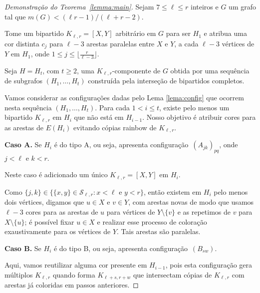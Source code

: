 \documentclass[12pt,a4paper]{book}
\newcommand{\K}{K_{\ell,r}} %
\newcommand{\Slr}{\mathcal{S}_{\ell,r}} %
\begin{document}
    \begin{proof}[Demonstração do Teorema~\ref{lemma:main}]
      Sejam $7 \leq \ell \leq r$ inteiros e $G$ um grafo tal que $m(G) < (\ell r - 1)/(\ell+r-2)$.
    
        Tome um bipartido $\K = [X,Y]$ arbitrário em $G$ para ser $H_1$ e atribua uma cor distinta $c_j$ para $\ell-3$ arestas paralelas entre $X$ e $Y$, a cada $\ell-3$ vértices de $Y$ em $H_1$, onde
        $1 \leq j \leq \lfloor \frac{r}{\ell-3}\rfloor$.

        Seja $H = H_t$, com $t \geq 2$, uma $\K$-componente de $G$ obtida por uma sequência de subgrafos $(H_1, \ldots, H_t)$ construída pela interseção de bipartidos completos.

         Vamos considerar as configurações dadas pelo Lema \ref{lema:config} que ocorrem nesta sequência $(H_1, \ldots, H_t)$.
         Para cada $1 < i \leq t$, existe pelo menos um bipartido $\K$ em $H_{i}$ que não está em $H_{i-1}$.
         Nosso objetivo é atribuir cores para as arestas de $E(H_{i})$ evitando cópias rainbow de $\K$.

         \medskip \textbf{Caso A.} Se $H_i$ é do tipo A, ou seja, apresenta configuração~\hyperref[configA]{$(A_{jk})_{pq}$}, onde $j < \ell$ e $k < r$.
         
        Neste caso é adicionado um único $\K = [X,Y]$ em $H_i$.      

        Como $\{j,k\} \in \{\{x,y\} \in \Slr: x < \ell \text{ e } y < r\}$, então existem em $H_i$ pelo menos dois vértices, digamos que $u\in X$ e $v\in Y$, com arestas novas de modo que 
        usamos $\ell-3$ cores para as arestas de $u$ para vértices de $Y\setminus\{v\}$ e as repetimos de $v$ para $X\setminus\{u\}$; é possível fixar $u \in X$ e realizar esse processo de coloração exaustivamente para os vértices de $Y$.
        Tais arestas são paralelas.
        

        \medskip \textbf{Caso B.} Se $H_i$ é do tipo B, ou seja, apresenta configuração~\hyperref[configB]{$(B_{sw})$}.
        
        Aqui, vamos reutilizar alguma cor presente em $H_{i-1}$, pois esta configuração gera múltiplos $\K$ quando forma $K_{\ell+s,r+w}$ que intersectam cópias de $\K$ com arestas já coloridas em passos anteriores.
        

\end{proof}
\end{document}
